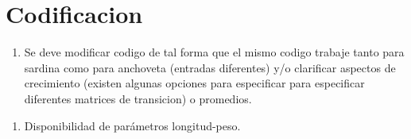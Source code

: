 \documentclass[]{article}
\providecommand{\tightlist}{%
  \setlength{\itemsep}{0pt}\setlength{\parskip}{0pt}}
\begin{document}
\section{Codificacion}\label{codificacion}

\begin{enumerate}
\def\labelenumi{\arabic{enumi}.}
\tightlist
\item
  Se deve modificar codigo de tal forma que el mismo codigo trabaje
  tanto para sardina como para anchoveta (entradas diferentes) y/o
  clarificar aspectos de crecimiento (existen algunas opciones para
  especificar para especificar diferentes matrices de transicion) o
  promedios.
\end{enumerate}

\begin{enumerate}
\def\labelenumi{\arabic{enumi})}
\setcounter{enumi}{1}
\tightlist
\item
  Disponibilidad de parámetros longitud-peso.
\end{enumerate}
\end{document}
